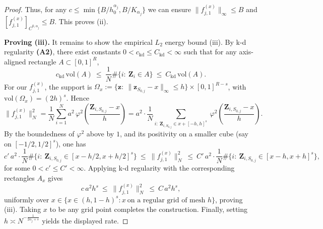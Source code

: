 \documentclass[11pt]{article}
\theoremstyle{plain}
\theoremstyle{definition}
\theoremstyle{plain}
\begin{document}
\begin{proof}
Thus, for any $c \le \min \{B/h_0 ^{\alpha_j},B/K_{\alpha_j}\}$ we can ensure $\|f_{j,1} ^{(x)}\|_{\infty} \le B$ and $\left[f_{j,1} ^{(x)}\right]_{C^{0,\alpha_j}} \le B.$ This proves (ii).

\textbf{Proving (iii).} It remains to show the empirical $L_2$ energy bound (iii). By k-d regularity \textbf{(A2)}, there exist constants $0<c_\mathrm{kd}\le C_\mathrm{kd}<\infty$ such that for any axis-aligned rectangle $A\subset[0,1]^R$,
\[
c_\mathrm{kd}\,\mathrm{vol}(A)\ \le\ \frac{1}{N}\#\{i:\ \bm Z_i\in A\}\ \le\ C_\mathrm{kd}\,\mathrm{vol}(A).
\]
For our $f_{j,1}^{(x)}$, the support is $\Omega_x:=\{ \bm z:\ \|\bm z_{S_{0,j}}-x\|_\infty\le h\}\times [0,1]^{R-s}$, with $\mathrm{vol}(\Omega_x)= (2h)^s$. Hence
\[
\|f_{j,1}^{(x)}\|_N^2
=\frac{1}{N}\sum_{i=1}^N a^2\,\varphi^2\left(\frac{\bm Z_{i,S_{0,j}}-x}{h}\right)
= a^2 \cdot \frac{1}{N}\sum_{i:\ \bm Z_{i,S_{0,j}}\in x+[-h,h]^s}\ \varphi^2\left(\frac{\bm Z_{i,S_{0,j}}-x}{h}\right).
\]
By the boundedness of $\varphi^2$ above by $1$, and its positivity on a smaller cube (say on $[-1/2,1/2]^s$), one has
\[
c'\,a^2\cdot \frac{1}{N} \#\{i:\ \bm Z_{i,S_{0,j}}\in [x-h/2,x+h/2]^s\}\ \le\ \|f_{j,1}^{(x)}\|_N^2\ \le\ C'\,a^2\cdot \frac{1}{N} \#\{i:\ \bm Z_{i,S_{0,j}}\in [x-h,x+h]^s\},
\]
for some $0<c'\le C'<\infty$. Applying k-d regularity with the corresponding rectangles $A_x$ gives
\[
c\,a^2 h^s\ \le\ \|f_{j,1}^{(x)}\|_N^2\ \le\ C\,a^2 h^s,
\]
uniformly over $x\in \{x\in(h,1-h)^s: x\ \text{on a regular grid of mesh }h\}$, proving (iii). Taking $x$ to be any grid point completes the construction. Finally, setting $h\asymp N^{-\frac{1}{2\alpha_j+s}}$ yields the displayed rate.
\end{proof}
\end{document}
